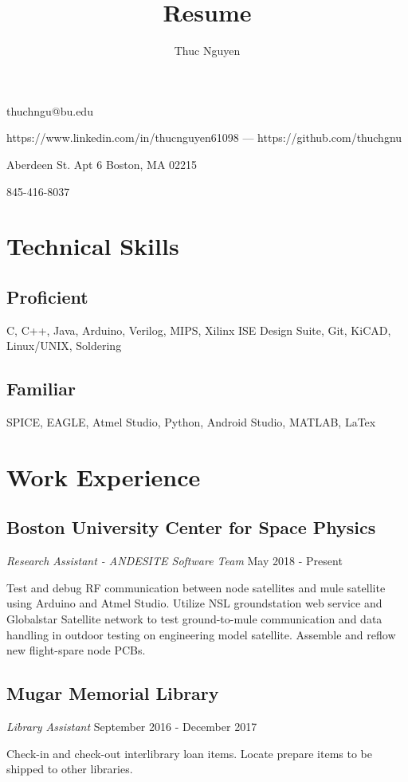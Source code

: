 \documentclass{article}
\makeatletter
\renewcommand{\maketitle}
{\begin{center}
{\huge\bfseries\theauthor}
\vspace{.5em}

thuchngu@bu.edu

https://www.linkedin.com/in/thucnguyen61098 --- https://github.com/thuchgnu

\end{center}}
\makeatother
\begin{document}
\title{Resume}
\author{Thuc Nguyen}
\maketitle
\vspace{-.5em}
{ Aberdeen St. Apt 6 Boston, MA 02215

845-416-8037

}
\vspace{-1.5em}
\section{Technical Skills}
\subsection{Proficient}
C, C++, Java, Arduino, Verilog, MIPS, Xilinx ISE Design Suite, Git, KiCAD, Linux/UNIX, Soldering
\vspace{-.75em}
\subsection{Familiar}
SPICE, EAGLE, Atmel Studio, Python, Android Studio, MATLAB, LaTex

\vspace{-.75em}
\section{Work Experience}
\subsection{Boston University Center for Space Physics}  \textit{Research Assistant - ANDESITE Software Team}
May 2018 - Present

Test and debug RF communication between node satellites and mule satellite using Arduino and Atmel Studio. Utilize NSL groundstation web service and Globalstar Satellite network to test ground-to-mule communication and data handling in outdoor testing on engineering model satellite. Assemble and reflow new flight-spare node PCBs.
\vspace{-.75em}
\subsection{Mugar Memorial Library} \textit{Library Assistant}
September 2016 - December 2017

Check-in and check-out interlibrary loan items. Locate prepare items to be shipped to other libraries.
\vspace{-.75em}
\end{document}

